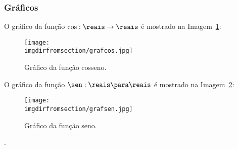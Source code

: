 \subsubsection{Gráficos}

\begin{example}
O gráfico da função $\cos : \reais \to \reais$ é mostrado na Imagem~\ref{img:grafico-cosseno}:
%
\begin{figure}[H]
\centering
\texttt{[image: \\imgdirfromsection/grafcos.jpg]}
\caption{Gráfico da função cosseno.}
\label{img:grafico-cosseno}
\end{figure}
\end{example}


\begin{example}
	O gráfico da função $\sen: \reais \para \reais$ é mostrado na Imagem~\ref{img:grafico-seno}:
	\begin{figure}[H]
		\centering 
		\texttt{[image: \\imgdirfromsection/grafsen.jpg]}
		\caption{Gráfico da função seno.}
		\label{img:grafico-seno}
	\end{figure}
\end{example}

\begin{onlineact}
	.
\end{onlineact}